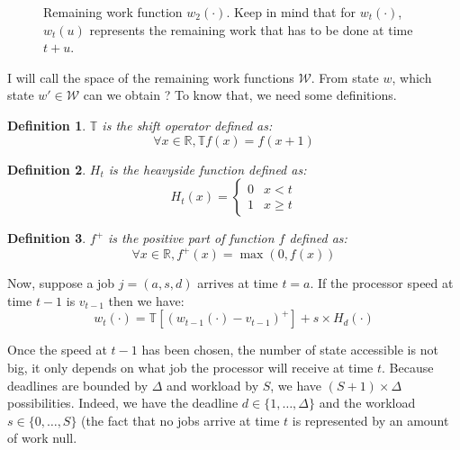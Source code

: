 \documentclass[
10pt, %
a4paper, %
oneside, %
headinclude,footinclude, %
BCOR5mm, %
]{scrartcl}
\newcommand{\T}{\mathbb{T}}
\newcommand{\W}{\mathcal{W}}
\newcommand{\R}{\mathbb{R}}
\newtheorem{defi}{Definition}
\begin{document}
\begin{figure}
  \centering
  \caption{Remaining work function $w_2(\cdot)$.
    Keep in mind that for $w_t(\cdot)$, $w_t(u)$ represents the
  remaining work that has to be done at time $t+u$.}
  \label{fig:workfun}
\end{figure}



I will call the space of the remaining work functions $\W$. From state
$w$, which state $w'\in\W$ can we obtain ? To know that, we need some
definitions.

\begin{defi}
  $\T$ is the shift operator defined as:
  \[ \forall x\in\R,\T f(x) = f(x+1)\]
\end{defi}

\begin{defi}
  $H_t$ is the heavyside function defined as:
  \[ H_t(x) =
    \begin{cases}
      0 & x<t \\
      1 & x\geq t
    \end{cases}
  \]
\end{defi}

\begin{defi}
  $f^+$ is the positive part of function $f$ defined as:
  \[
    \forall x\in\R, f^+(x)=\max(0,f(x))
  \]
\end{defi}

Now, suppose a job $j=(a,s,d)$ arrives at time $t=a$. If the processor
speed at time $t-1$ is $v_{t-1}$ then we have:
\begin{equation}
  \label{eq:nextw}
  w_t(\cdot)=\T[(w_{t-1}(\cdot)-v_{t-1})^+]+s\times H_d(\cdot)
\end{equation}

Once the speed at $t-1$ has been chosen, the number of state
accessible is not big, it only depends on what job the processor will
receive at time $t$. Because deadlines are bounded by $\Delta$ and
workload by $S$, we have $(S+1)\times\Delta$ possibilities. Indeed, we
have the deadline $d\in\{1,\dots, \Delta\}$ and the workload
$s\in\{0,\dots, S\}$ (the fact that no jobs arrive at time $t$ is
represented by an amount of work null.
\end{document}

